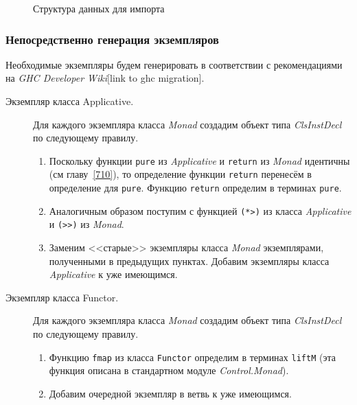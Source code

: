 \begin{figure}[h]
\caption{Структура данных для импорта}\label{import}
\end{figure}

\subsubsection{Непосредственно генерация экземпляров}\label{instgen}
Необходимые экземпляры будем генерировать в соответствии с рекомендациями на \textit{GHC Developer Wiki}[link to ghc migration].
\begin{description}
\item[Экземпляр класса Applicative.] Для каждого экземпляра класса \textit{Monad} создадим объект типа \textit{ClsInstDecl} по следующему правилу.
    \begin{enumerate}
        \item Поскольку функции \lstinline{pure} из \textit{Applicative} и \lstinline{return} из \textit{Monad} идентичны (см главу~\ref{710}), то определение функции \lstinline{return} перенесём в определение для \lstinline{pure}. Функцию \lstinline{return} определим в терминах \lstinline{pure}.
        \item Аналогичным образом поступим с функцией \lstinline{(*>)} из класса \textit{Applicative} и \lstinline{(>>)} из \textit{Monad}.
        \item Заменим <<старые>> экземпляры класса \textit{Monad} экземплярами, полученными в предыдущих пунктах. Добавим экземпляры класса \textit{Applicative} к уже имеющимся.
    \end{enumerate}
\item[Экземпляр класса Functor.] Для каждого экземпляра класса \textit{Monad} создадим объект типа \textit{ClsInstDecl} по следующему правилу.
    \begin{enumerate}
        \item Функцию \lstinline{fmap} из класса \lstinline{Functor} определим в терминах \lstinline{liftM} (эта функция описана в стандартном модуле \textit{Control.Monad}).
        \item Добавим очередной экземпляр в ветвь к уже имеющимся.
    \end{enumerate}
\end{description}

